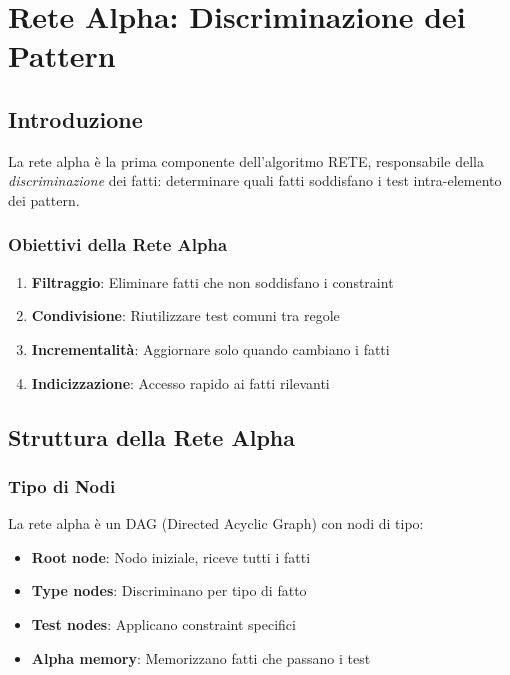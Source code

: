
\chapter{Rete Alpha: Discriminazione dei Pattern}
\label{cap:rete_alpha}

\section{Introduzione}

La rete alpha è la prima componente dell'algoritmo RETE, responsabile della \textit{discriminazione} dei fatti: determinare quali fatti soddisfano i test intra-elemento dei pattern.

\subsection{Obiettivi della Rete Alpha}

\begin{infobox}
\begin{enumerate}
\item \textbf{Filtraggio}: Eliminare fatti che non soddisfano i constraint
\item \textbf{Condivisione}: Riutilizzare test comuni tra regole
\item \textbf{Incrementalità}: Aggiornare solo quando cambiano i fatti
\item \textbf{Indicizzazione}: Accesso rapido ai fatti rilevanti
\end{enumerate}
\end{infobox}

\section{Struttura della Rete Alpha}

\subsection{Tipo di Nodi}

\begin{definizione}
La rete alpha è un DAG (Directed Acyclic Graph) con nodi di tipo:
\begin{itemize}
\item \textbf{Root node}: Nodo iniziale, riceve tutti i fatti
\item \textbf{Type nodes}: Discriminano per tipo di fatto
\item \textbf{Test nodes}: Applicano constraint specifici
\item \textbf{Alpha memory}: Memorizzano fatti che passano i test
\end{itemize}
\end{definizione}

